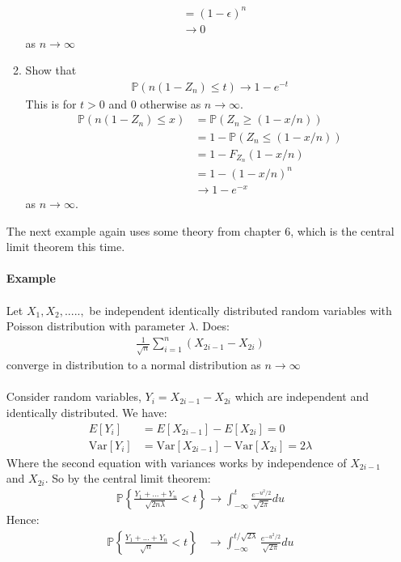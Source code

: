 \documentclass[,oneside]{article}
\begin{document}
\begin{enumerate}
\begin{enumerate}
\begin{align*}
&= (1-\epsilon)^n\\
&\rightarrow 0 
\end{align*}
as $n \rightarrow \infty$
\item Show that 
\begin{align*}
\mathbb{P}(n(1-Z_n) \leq t) \rightarrow 1-e^{-t}
\end{align*}
This is for $t > 0$ and 0 otherwise as $n \rightarrow \infty$.\\
\begin{align*}
\mathbb{P}(n(1-{Z_n})\leq x) &= \mathbb{P}(Z_n \geq (1-x/n))\\
&=1- \mathbb{P}(Z_n \leq (1-x/n))\\
&= 1-F_{Z_n}(1-x/n)\\
&= 1-(1-x/n)^n \\
&\rightarrow 1-e^{-x} 
\end{align*}
as $n \rightarrow \infty$.\\
\end{enumerate}
The next example again uses some theory from chapter 6, which is the central limit theorem this time.\\ \\
\textbf{Example}\\ \\
Let $X_1,X_2,.....,$ be independent identically distributed random variables with Poisson distribution with parameter $\lambda$. Does:
\begin{align*}
\frac{1}{\sqrt{n}}\sum_{i=1}^{n}(X_{2i-1}-X_{2i})
\end{align*}
converge in distribution to a normal distribution as $n \rightarrow \infty$\\ \\
Consider random variables, $Y_i = X_{2i-1}-X_{2i}$ which are independent and identically distributed. We have:
\begin{align*}
E[Y_i]&=E[X_{2i-1}]-E[X_{2i}]=0\\
\text{Var}[Y_i]&=\text{Var}[X_{2i-1}]-\text{Var}[X_{2i}]=2\lambda
\end{align*}
Where the second equation with variances works by independence of $X_{2i-1}$ and $X_{2i}$. So by the central limit theorem:
\begin{align*}
\mathbb{P} \left \{ \frac{Y_1+...+Y_n}{\sqrt{2n\lambda} } < t \right \} \rightarrow \int_{-\infty}^t \frac{e^{-u^2/2}}{\sqrt{2\pi}}du
\end{align*}
Hence:
\begin{align*}
\mathbb{P} \left \{ \frac{Y_1+...+Y_n}{\sqrt{n} } < t \right \} &\rightarrow \int_{-\infty}^{t/\sqrt{2\lambda}} \frac{e^{-u^2/2}}{\sqrt{2\pi}}du\\

\end{align*}
\end{enumerate}
\end{document}
